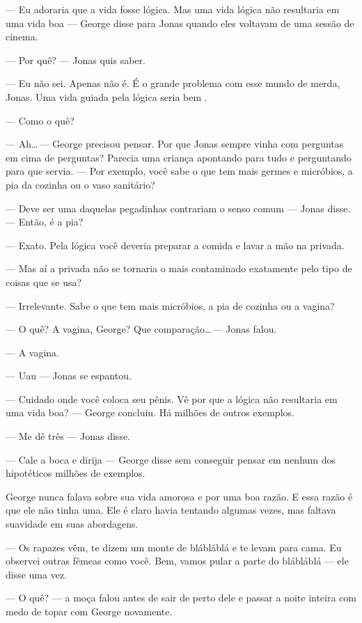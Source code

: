 --- Eu adoraria que a vida fosse lógica. Mas uma vida lógica não resultaria em uma vida boa --- George disse para Jonas\mudanca{,} quando eles voltavam de uma sessão de cinema.

--- Por quê? --- Jonas quis saber.

--- Eu não sei. Apenas não é. É o grande problema com esse mundo de merda, Jonas. Uma vida guiada pela lógica seria bem .

--- Como o quê?

--- Ah\ldots\,--- George precisou pensar. Por que Jonas sempre vinha com perguntas em cima de perguntas? Parecia uma criança apontando para tudo e perguntando para que servia. --- Por exemplo, você sabe o que tem mais germes e micróbios, a pia da cozinha ou o vaso sanitário?

--- Deve ser uma daquelas pegadinhas  contrariam o senso comum --- Jonas disse. --- Então, é a pia?

--- Exato. Pela lógica\mudanca{,} você deveria preparar a comida e lavar a mão na privada.

--- Mas aí a privada não se tornaria o mais contaminado exatamente pelo tipo de coisas que se usa?

--- Irrelevante. Sabe o que tem mais micróbios, a pia de cozinha ou a vagina?

--- O quê? A vagina, George? Que comparação\ldots\,--- Jonas falou.

--- A vagina.

--- Uau --- Jonas se espantou.

--- Cuidado onde você coloca seu pênis. Vê por que a lógica não resultaria em uma vida boa? --- George concluiu. Há milhões de outros exemplos.

--- Me dê três --- Jonas disse.

--- Cale a boca e dirija --- George disse\mudanca{,} sem conseguir pensar em nenhum dos hipotéticos milhões de exemplos.

George nunca falava sobre sua vida amorosa\mudanca{,} e por uma boa razão. E essa razão é que ele não tinha uma. Ele é claro havia tentando algumas vezes, mas faltava suavidade em suas abordagens.

--- Os rapazes vêm, te dizem um monte de blábláblá e te levam para cama. Eu observei outras fêmeas como você. Bem, vamos pular a parte do blábláblá ---  ele disse uma vez.

--- O quê? --- a moça falou\mudanca{,} antes de sair de perto dele e passar a noite inteira com medo de topar com George novamente.

